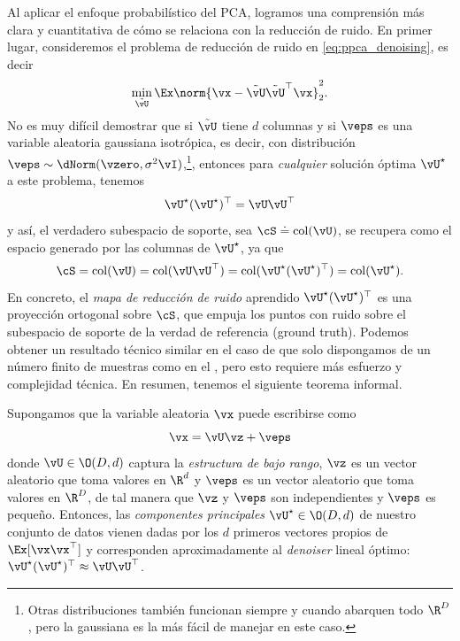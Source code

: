 \documentclass[../../book-main.tex]{subfiles}
\begin{document}
\begin{remark}
    Al aplicar el enfoque probabilístico del PCA, logramos una comprensión más clara
    y cuantitativa de cómo se relaciona con la reducción de ruido. En primer lugar, 
    consideremos el problema de reducción de ruido en \eqref{eq:ppca_denoising}, 
    es decir
    \begin{equation}
        \min_{\tilde{\vU}}\Ex\norm{\vx -
        \tilde{\vU}\tilde{\vU}^{\top}\vx}_{2}^{2}.
    \end{equation}
    No es muy difícil demostrar que si $\tilde{\vU}$ tiene $d$ columnas y si
    \(\veps\) es una variable aleatoria gaussiana isotrópica, es decir, con 
    distribución \(\veps \sim \dNorm(\vzero, \sigma^{2}\vI)\),\footnote{Otras 
        distribuciones también funcionan siempre y cuando abarquen todo \(\R^{D}\), 
    pero la gaussiana es la más fácil de manejar en este caso.}, entonces
    para \textit{cualquier} solución óptima \(\vU^{\star}\) a este problema, tenemos
    \begin{equation}
        \vU^{\star}(\vU^{\star})^{\top} = \vU\vU^{\top}
    \end{equation}
    y así, el verdadero subespacio de soporte, sea \(\cS \doteq
    \mathop{\mathrm{col}}(\vU)\), se
    recupera como el espacio generado por las columnas de \(\vU^{\star}\), ya que
    \begin{equation}
        \cS = \mathop{\mathrm{col}}(\vU) = \mathop{\mathrm{col}}(\vU\vU^{\top})
        = \mathop{\mathrm{col}}(\vU^{\star}(\vU^{\star})^{\top})
        = \mathop{\mathrm{col}}(\vU^{\star}).
    \end{equation}
    En concreto, el \textit{mapa de reducción de ruido} aprendido
    \(\vU^{\star}(\vU^{\star})^{\top}\) es una proyección ortogonal
    sobre \(\cS\), que empuja los puntos con ruido sobre el subespacio de soporte
    de la verdad de referencia (ground truth). Podemos obtener un resultado técnico similar
    en el caso de que solo dispongamos de un número finito de muestras como en el
    , pero esto requiere más esfuerzo y complejidad técnica.
    En resumen, tenemos el siguiente teorema informal.
\end{remark}

\begin{theorem}\label{thm:ppca}
    Supongamos que la variable aleatoria \(\vx\) puede escribirse como
    \begin{equation}
        \vx = \vU\vz + \veps
    \end{equation}
    donde \(\vU \in \O(D, d)\) captura la \textit{estructura de bajo rango}, \(\vz\)
    es un vector aleatorio que toma valores en \(\R^{d}\) y \(\veps\) es un vector aleatorio
    que toma valores en \(\R^{D}\), de tal manera que \(\vz\) y \(\veps\) son
    independientes y \(\veps\) es pequeño. Entonces, las \textit{componentes principales}
    \(\vU^{\star} \in \O(D, d)\) de nuestro conjunto de datos vienen dadas por los \(d\) primeros
    vectores propios de \(\Ex[\vx\vx^{\top}]\) y corresponden aproximadamente al
    \textit{denoiser} lineal óptimo: \(\vU^{\star}(\vU^{\star})^{\top}
    \approx \vU\vU^{\top}\).
\end{theorem}
\end{document}

